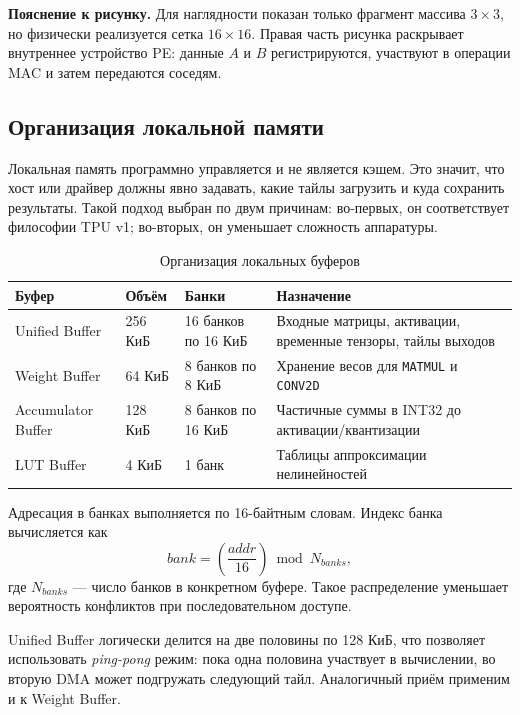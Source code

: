 \documentclass[12pt,a4paper]{article}
\begin{document}
\textbf{Пояснение к рисунку.} Для наглядности показан только фрагмент массива \(3 \times 3\), но физически реализуется сетка \(16 \times 16\). Правая часть рисунка раскрывает внутреннее устройство PE: данные \(A\) и \(B\) регистрируются, участвуют в операции MAC и затем передаются соседям.

\subsection{Организация локальной памяти}

Локальная память программно управляется и не является кэшем. Это значит, что хост или драйвер должны явно задавать, какие тайлы загрузить и куда сохранить результаты. Такой подход выбран по двум причинам: во-первых, он соответствует философии TPU v1; во-вторых, он уменьшает сложность аппаратуры.

\begin{table}[H]
    \centering
    \caption{Организация локальных буферов}
    \begin{tabular}{|L{3.5cm}|L{2.3cm}|L{3.0cm}|L{6.0cm}|}
        \hline
        \textbf{Буфер} & \textbf{Объём} & \textbf{Банки} & \textbf{Назначение} \\
        \hline
        Unified Buffer & 256 КиБ & 16 банков по 16 КиБ & Входные матрицы, активации, временные тензоры, тайлы выходов \\
        \hline
        Weight Buffer & 64 КиБ & 8 банков по 8 КиБ & Хранение весов для \texttt{MATMUL} и \texttt{CONV2D} \\
        \hline
        Accumulator Buffer & 128 КиБ & 8 банков по 16 КиБ & Частичные суммы в INT32 до активации/квантизации \\
        \hline
        LUT Buffer & 4 КиБ & 1 банк & Таблицы аппроксимации нелинейностей \\
        \hline
    \end{tabular}
\end{table}

Адресация в банках выполняется по 16-байтным словам. Индекс банка вычисляется как
\[
\textit{bank} = \left(\frac{\textit{addr}}{16}\right) \bmod N_{banks},
\]
где \(N_{banks}\) --- число банков в конкретном буфере. Такое распределение уменьшает вероятность конфликтов при последовательном доступе.

Unified Buffer логически делится на две половины по 128 КиБ, что позволяет использовать \textit{ping-pong} режим: пока одна половина участвует в вычислении, во вторую DMA может подгружать следующий тайл. Аналогичный приём применим и к Weight Buffer.
\end{document}
